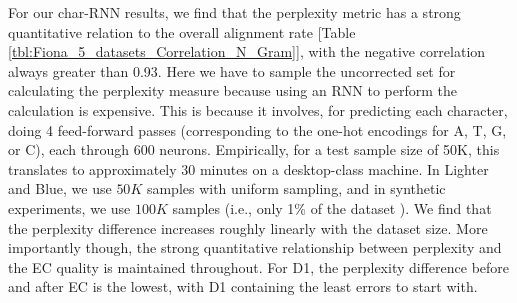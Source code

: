 For our char-RNN results, we find that the perplexity metric has a strong quantitative relation to the overall alignment rate [Table \ref{tbl:Fiona_5_datasets_Correlation_N_Gram}], with the negative correlation always greater than 0.93.
Here we have to sample the uncorrected set for calculating the perplexity measure because using an RNN to perform the calculation is expensive. This is because it involves, for predicting each character, doing 4 feed-forward passes (corresponding to the one-hot encodings for A, T, G, or C), each through 600 neurons. Empirically, for a test sample size of 50K, this translates to approximately 30 minutes on a desktop-class machine.  
In Lighter and Blue, we use $50K$ samples with uniform sampling, and in synthetic experiments, we use $100K$ samples (i.e., only 1\% of the dataset ).
We find that the perplexity difference increases roughly linearly with the dataset size. More importantly though, the strong quantitative relationship between perplexity and the EC quality is maintained throughout. For D1, the perplexity difference before and after EC is the lowest, with D1 containing the least errors to start with. 


